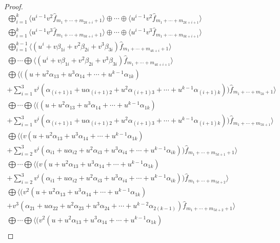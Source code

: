 \documentclass{amsart}
\theoremstyle{definition}
\theoremstyle{remark}
\numberwithin{equation}{section}
\begin{document}
\begin{proof}
\begin{gather*}
   \bigoplus_{i=1}^{k}\langle u^{i-1}v^2\hat{f}_{m_1+\cdots +m_{2k+i}+1}\rangle \oplus\cdots\oplus \langle u^{i-1}v^2\hat{f}_{m_1+\cdots +m_{2k+i+1}}\rangle\\
   \bigoplus_{i=1}^{k}\langle u^{i-1}v^3\hat{f}_{m_1+\cdots +m_{3k+i}+1}\rangle \oplus\cdots\oplus \langle u^{i-1}v^3\hat{f}_{m_1+\cdots +m_{3k+i+1}}\rangle\\
   \bigoplus_{i=1}^{k-1} \langle (u^i+ v\beta_{1i} + v^2\beta_{2i} + v^3\beta_{3i})\hat{f}_{m_1+\cdots+m_{4k+i}+1}\rangle \\
   \bigoplus \cdots \bigoplus \langle (u^i+ v\beta_{1i} + v^2\beta_{2i} + v^3\beta_{3i})\hat{f}_{m_1+\cdots+m_{4k+i+1}}\rangle \\
   \bigoplus \langle ((u + u^2\alpha_{13} + u^3\alpha_{14} + \cdots + u^{k-1}\alpha_{1k})
     \\ + \sum_{i=1}^{3} v^i( \alpha_{(i+1)1} + u\alpha_{(i+1)2} + u^2\alpha_{(i+1)3} +  \cdots + u^{k-1}\alpha_{(i+1)k} ))\hat{f}_{m_1+\cdots+m_{5k}+1}\rangle \\
      \bigoplus \cdots \bigoplus \langle ((u + u^2\alpha_{13} + u^3\alpha_{14} + \cdots + u^{k-1}\alpha_{1k})
     \\ + \sum_{i=1}^{3} v^i( \alpha_{(i+1)1} + u\alpha_{(i+1)2} + u^2\alpha_{(i+1)3} +  \cdots + u^{k-1}\alpha_{(i+1)k} ))\hat{f}_{m_1+\cdots+m_{5k+1}}\rangle \\
    \bigoplus \langle(v(u + u^2\alpha_{13} + u^3\alpha_{14} + \cdots + u^{k-1}\alpha_{1k})
     \\  + \sum_{i=2}^{3} v^i( \alpha_{i1} + u\alpha_{i2} + u^2\alpha_{i3} + u^3\alpha_{i4} + \cdots + u^{k-1}\alpha_{ik} ))\hat{f}_{m_1+\cdots+m_{5k+1}+1} \rangle \\
     \bigoplus \cdots \bigoplus  \langle(v(u + u^2\alpha_{13} + u^3\alpha_{14} + \cdots + u^{k-1}\alpha_{1k})
     \\  + \sum_{i=2}^{3} v^i( \alpha_{i1} + u\alpha_{i2} + u^2\alpha_{i3} + u^3\alpha_{i4} + \cdots + u^{k-1}\alpha_{ik} ))\hat{f}_{m_1+\cdots+m_{5k+2}} \rangle   \\
        \bigoplus \langle (v^2(u + u^2\alpha_{13} + u^3\alpha_{14} + \cdots + u^{k-1}\alpha_{1k}) \\
        + v^3( \alpha_{21} + u\alpha_{22} + u^2\alpha_{23} + u^3\alpha_{24} + \cdots + u^{k-2}\alpha_{2(k-1)} )\hat{f}_{m_1+\cdots+m_{5k+2}+1} \rangle \\
         \bigoplus \cdots \bigoplus \langle (v^2(u + u^2\alpha_{13} + u^3\alpha_{14} + \cdots + u^{k-1}\alpha_{1k}) \\

\end{gather*}
\end{proof}
\end{document}
